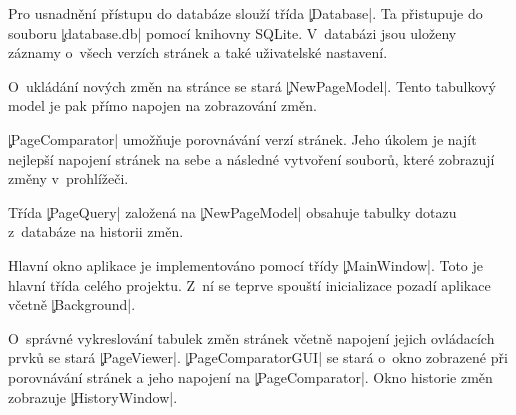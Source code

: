 Pro usnadnění přístupu do databáze slouží třída \c|Database|.
Ta přistupuje do souboru \c|database.db| %
pomocí knihovny SQLite.
V~databázi jsou uloženy záznamy o~všech verzích stránek a také uživatelské nastavení.

O~ukládání nových změn na stránce se stará \c|NewPageModel|. Tento tabulkový model je pak přímo napojen na zobrazování změn.

\c|PageComparator| umožňuje porovnávání verzí stránek.
Jeho úkolem je najít nejlepší napojení stránek na sebe a následné vytvoření souborů, které zobrazují změny v~prohlížeči.

Třída \c|PageQuery| založená na \c|NewPageModel| obsahuje tabulky dotazu z~databáze na historii změn.

Hlavní okno aplikace je implementováno pomocí třídy \c|MainWindow|. Toto je hlavní třída celého projektu.
Z~ní se teprve spouští inicializace pozadí aplikace včetně \c|Background|.

O~správné vykreslování tabulek změn stránek včetně napojení jejich ovládacích prvků se stará \c|PageViewer|.
\c|PageComparatorGUI| se stará o~okno zobrazené při porovnávání stránek a jeho napojení na \c|PageComparator|.
Okno historie změn zobrazuje \c|HistoryWindow|.

